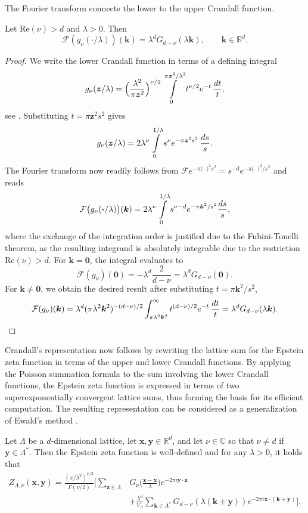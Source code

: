\documentclass[]{amsart}
\newcommand{\new}[1]{#1}
\newcommand{\zeps}[3]{\new{Z_{#1} (#2, #3)}}
\newcommand{\crandallreqs}{
Let \(\Lambda\) be a \(d\)-dimensional lattice,
let \(\bm x,\bm y\in\mathds{R}^d\), and let \(\nu\in\mathds C\)
so that \(\nu\neq d\) if \(\bm y\in\Lambda^{\ast}\). }
\numberwithin{mythm}{section}
\begin{document}
The Fourier transform connects the lower to the upper Crandall function.
\begin{lemma}
\label{gn-fourier}
Let $\mathrm{Re}(\nu)>d$ and $\lambda >0$. Then
\[\mathcal{F}(g_\nu(\cdot/\lambda))(\bm k) = \lambda^d G_{d-\nu}(\lambda \bm k)
,\qquad \bm k\in\mathds R^d.\]
\end{lemma}
\begin{proof}
We write the lower Crandall function in terms
of a     defining integral
\[g_\nu(\bm z / \lambda) = \Bigl(\frac{\lambda^2}{\pi \bm z^2} \Bigr)^{\nu/2} \int \limits_0^{\pi \bm z^2 / \lambda^2} t^{\nu/2} e^{-t}\,\frac{\rm{d}t}{t},\]
see \cite[Eq. (6.5.2)]{abramowitz}.
Substituting $t = \pi \bm z^2 s^2$ gives
\[g_\nu(\bm z / \lambda) = 2 \lambda^\nu \int \limits_0^{1/\lambda} s^{\nu} e^{-\pi \bm z^2 s^2}\, \frac{\rm{d}s}{s}.\]
The Fourier transform now readily follows from 
$\mathcal F e^{-\pi \bm (\cdot)^2 s^2} = s^{-d}e^{-\pi \bm (\cdot)^2/s^2}$ and reads
\[
\mathcal F \big(g_\nu (\bm \cdot/\lambda)\big) (\bm k) = 2 \lambda^\nu \int \limits_0^{1/\lambda} s^{\nu-d} e^{-\pi \bm{k}^2/s^2} \frac{\rm{d}s}{s},\]
where the exchange of the integration order is justified due to the Fubini-Tonelli theorem, as the resulting integrand is absolutely integrable due to the restriction $\mathrm{Re}(\nu)>d$.
For $\bm k = \bm 0$, the integral evaluates to
\[\mathcal{F}(g_\nu)(\bm 0) = -\lambda^d \frac{2}{d-\nu} = \lambda^dG_{d-\nu}(\bm 0).\]
For $\bm k\neq \bm 0$, we obtain the desired result after substituting $t = \pi \bm k^2 / s^2$,
\[\mathcal{F}(g_\nu)(\bm k) = 
\lambda^d (\pi \lambda^2 \bm k^2)^{-(d-\nu)/2} 
\int_{\pi \lambda^2 \bm k^2}^\infty t^{(d-\nu)/2} e^{-t}\,\frac{\rm{d}t}{t} = \lambda^d G_{d-\nu}(\lambda \bm k).
\qedhere
\]
\end{proof}


Crandall's representation now follows by rewriting the lattice sum for the Epstein zeta function in terms of the upper and lower Crandall functions. By applying the Poisson summation formula to the sum involving the lower Crandall functions, the Epstein zeta function is expressed in terms of two superexponentially convergent lattice sums, thus forming the basis for its efficient computation. The resulting representation can be considered as a generalization of Ewald's method  \cite{ewald1921berechnung}.

  \begin{theorem}
  \label{crandall}
 \crandallreqs
	 Then  the Epstein zeta function is well-defined and
	 for any $\lambda>0$, it holds that
\begin{align*}
\zeps{\Lambda,\nu}{\bm{x}}{\bm{y}}
=\frac{(\pi/\lambda^2 )^{\nu/2}}{\Gamma(\nu/2)}\Bigg[
\sum_{\bm{z}\in\Lambda}
&G_{\nu}\Big(\frac{\bm{z}-\bm{x}}{\lambda}\Big)e^{-2\pi i\bm{y}\cdot\bm{z}}
\\
&
+\frac{\lambda^d}{V_{\Lambda}}
\sum_{\bm{k}\in\Lambda^{\ast}}G_{d-\nu}
(\lambda(\bm{k}+\bm{y}))e^{-2\pi i\bm{x}\cdot(\bm{k}+\bm{y})}
\Bigg].
\end{align*}
\end{theorem}
\end{document}
